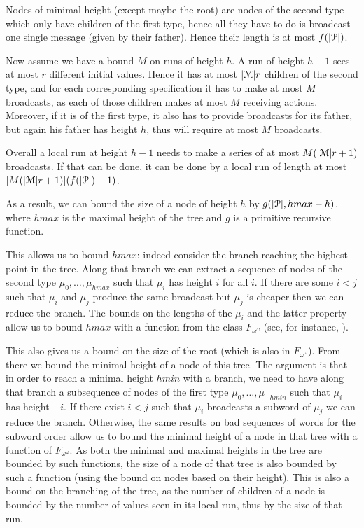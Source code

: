  Nodes of minimal height (except maybe the root) are nodes of the second type which only have children of the first type, hence all they have to do is broadcast one single message (given by their father). Hence their length is at most $f(|\mathcal{P}|)$. 
 
 Now assume we have a bound $M$ on runs of height $h$. A run of height $h-1$ sees at most $r$ different initial values. Hence it has at most $|\mathcal{M}|r$ children of the second type, and for each corresponding specification it has to make at most $M$ broadcasts, as each of those children makes at most $M$ receiving actions.
 Moreover, if it is of the first type, it also has to provide broadcasts for its father, but again his father has height $h$, thus will require at most $M$ broadcasts.
 
 Overall a local run at height $h-1$ needs to make a series of at most $M(|\mathcal{M}| r +1)$ broadcasts. If that can be done, it can be done by a local run of length at most $[M(|\mathcal{M}| r +1)](f(|\mathcal{P}|)+1)$.
 
 As a result, we can bound the size of a node of height $h$ by $g(|\mathcal{P}|, hmax-h)$, where $hmax$ is the maximal height of the tree and $g$ is a primitive recursive function.
 
 This allows us to bound $hmax$: indeed consider the branch reaching the highest point in the tree. Along that branch we can extract a sequence of nodes of the second type $\mu_0, \ldots, \mu_{hmax}$ such that $\mu_i$ has height $i$ for all $i$. If there are some $i<j$ such that $\mu_i$ and $\mu_j$ produce the same broadcast but $\mu_j$ is cheaper then we can reduce the branch.
 The bounds on the lengths of the $\mu_i$ and the latter property allow us to bound $hmax$ with a function from the class $F_{\omega^\omega}$ (see, for instance, \cite{schmitzS2011}).
 
 This also gives us a bound on the size of the root (which is also in $F_{\omega^\omega}$). From there we bound the minimal height of a node of this tree. The argument is that in order to reach a minimal height $hmin$ with a branch, we need to have along that branch a subsequence of nodes of the first type $\mu_0, \ldots, \mu_{-hmin}$ such that $\mu_i$ has height $-i$. If there exist $i<j$ such that $\mu_i$ broadcasts a subword of $\mu_j$ we can reduce the branch. Otherwise, the same results on bad sequences of words  for the subword order allow us to bound the minimal height of a node in that tree with a function of $F_{\omega^\omega}$.
 As both the minimal and maximal heights in the tree are bounded by such functions, the size of a node of that tree is also bounded by such a function (using the bound on nodes based on their height). This is also a bound on the branching of the tree, as the number of children of a node is bounded by the number of values seen in its local run, thus by the size of that run.
 
